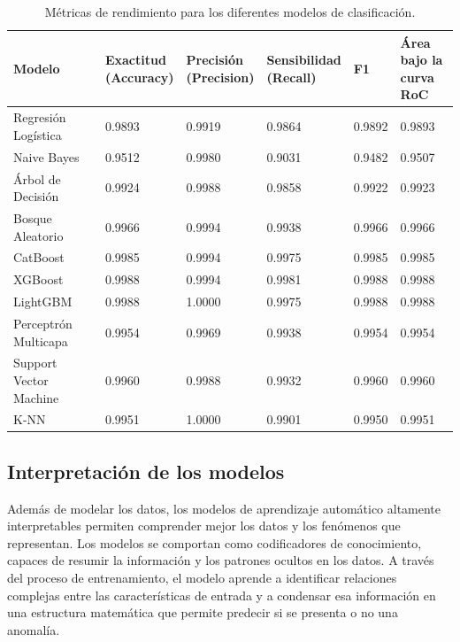 \documentclass[11pt,a4paper,spanish]{book}
\numberwithin{equation}{chapter}
\numberwithin{figure}{chapter}
\begin{document}
\begin{table}[H]
\caption{Métricas de rendimiento para los diferentes modelos de clasificación.}
\centering
\renewcommand{\arraystretch}{1.2}
\footnotesize
\begin{tabularx}{\textwidth}{|l|X|X|X|X|X|}
\hline
\textbf{Modelo} & 
\centering \textbf{Exactitud \\ (Accuracy)} & 
\centering \textbf{Precisión \\ (Precision)} & 
\centering \textbf{Sensibilidad \\ (Recall)} & 
\centering \textbf{F1} & 
\centering \textbf{Área bajo la \\ curva RoC} \tabularnewline
\hline
Regresión Logística & 0.9893 & 0.9919 & 0.9864 & 0.9892 & 0.9893 \\
\hline
Naive Bayes & 0.9512 & 0.9980 & 0.9031 & 0.9482 & 0.9507 \\
\hline
Árbol de Decisión & 0.9924 & 0.9988 & 0.9858 & 0.9922 & 0.9923 \\
\hline
Bosque Aleatorio & 0.9966 & 0.9994 & 0.9938 & 0.9966 & 0.9966 \\
\hline
CatBoost & 0.9985 & 0.9994 & 0.9975 & 0.9985 & 0.9985 \\
\hline
XGBoost & 0.9988 & 0.9994 & 0.9981 & 0.9988 & 0.9988 \\
\hline
LightGBM & 0.9988 & 1.0000 & 0.9975 & 0.9988 & 0.9988 \\
\hline
Perceptrón Multicapa & 0.9954 & 0.9969 & 0.9938 & 0.9954 & 0.9954 \\
\hline
Support Vector Machine & 0.9960 & 0.9988 & 0.9932 & 0.9960 & 0.9960 \\
\hline
K-NN & 0.9951 & 1.0000 & 0.9901 & 0.9950 & 0.9951 \\
\hline
\end{tabularx}
\label{tab:metricas_modelos}
\end{table}



\subsection{Interpretación de los modelos}


Además de modelar los datos, los modelos de aprendizaje automático altamente 
interpretables permiten comprender mejor los datos y los fenómenos que representan. 
Los modelos se comportan como codificadores de conocimiento, capaces de resumir la 
información y los patrones ocultos en los datos. A través del proceso de entrenamiento, 
el modelo aprende a identificar relaciones complejas entre las características de entrada 
y a condensar esa información en una estructura matemática que permite predecir si se 
presenta o no una anomalía. 
\end{document}
